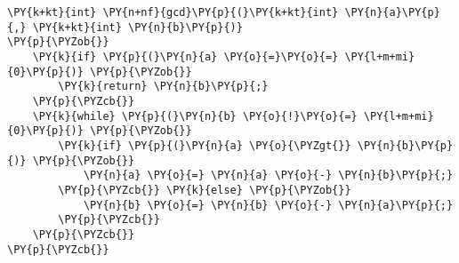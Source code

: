 \begin{Verbatim}[commandchars=\\\{\}]
\PY{k+kt}{int} \PY{n+nf}{gcd}\PY{p}{(}\PY{k+kt}{int} \PY{n}{a}\PY{p}{,} \PY{k+kt}{int} \PY{n}{b}\PY{p}{)}
\PY{p}{\PYZob{}}
    \PY{k}{if} \PY{p}{(}\PY{n}{a} \PY{o}{=}\PY{o}{=} \PY{l+m+mi}{0}\PY{p}{)} \PY{p}{\PYZob{}}
        \PY{k}{return} \PY{n}{b}\PY{p}{;}
    \PY{p}{\PYZcb{}}
    \PY{k}{while} \PY{p}{(}\PY{n}{b} \PY{o}{!}\PY{o}{=} \PY{l+m+mi}{0}\PY{p}{)} \PY{p}{\PYZob{}}
        \PY{k}{if} \PY{p}{(}\PY{n}{a} \PY{o}{\PYZgt{}} \PY{n}{b}\PY{p}{)} \PY{p}{\PYZob{}}
            \PY{n}{a} \PY{o}{=} \PY{n}{a} \PY{o}{-} \PY{n}{b}\PY{p}{;}
        \PY{p}{\PYZcb{}} \PY{k}{else} \PY{p}{\PYZob{}}
            \PY{n}{b} \PY{o}{=} \PY{n}{b} \PY{o}{-} \PY{n}{a}\PY{p}{;}
        \PY{p}{\PYZcb{}}
    \PY{p}{\PYZcb{}}
\PY{p}{\PYZcb{}}
\end{Verbatim}
